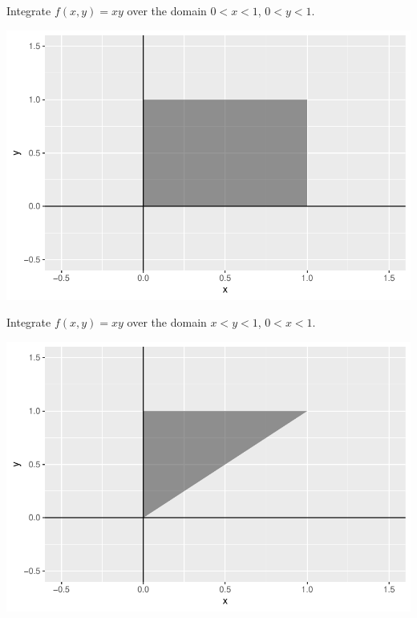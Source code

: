 \begin{frame}
  \begin{block}{\example}
    Integrate $f(x,y)=xy$ over the domain $0<x<1$, $0<y<1$.
    
    \begin{center}
    \includegraphics[height = .5\textheight]{figure/example1-1}
    \end{center}
  \end{block}
\end{frame}




\begin{frame}
  \begin{block}{\example}
    Integrate $f(x,y)=xy$ over the domain $x<y<1$, $0<x<1$.
    
    \begin{center}
    \includegraphics[height = .5\textheight]{figure/example2-1}
    \end{center}
  \end{block}
\end{frame}


